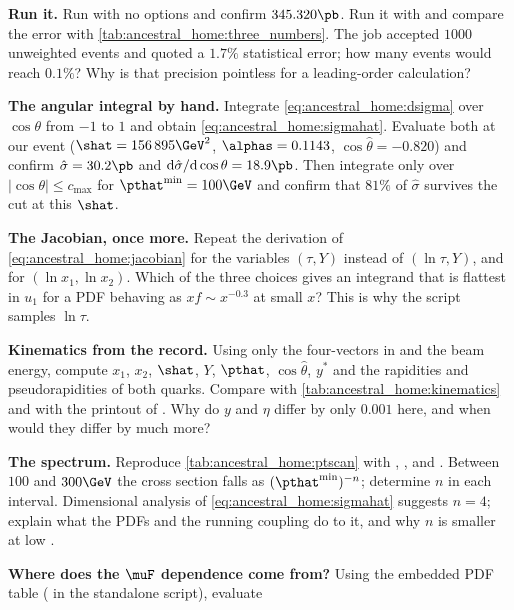 \begin{exercises}
\item \textbf{Run it.} Run  with no
  options and confirm $345.320\pb$. Run it with  and
  compare the error with \cref{tab:ancestral_home:three_numbers}. The
  \CMSSW job accepted $1000$ unweighted events and quoted a $1.7\%$
  statistical error; how many events would reach $0.1\%$? Why is that
  precision pointless for a leading-order calculation?
\item \textbf{The angular integral by hand.} Integrate
  \cref{eq:ancestral_home:dsigma} over $\cos\theta$ from $-1$ to $1$ and
  obtain \cref{eq:ancestral_home:sigmahat}. Evaluate both at our event
  ($\shat=156\,895\GeV^2$, $\alphas=0.1143$, $\cos\hat\theta=-0.820$) and
  confirm $\hat\sigma=30.2\pb$ and
  $\mathrm{d}\hat\sigma/\mathrm{d}\cos\theta=18.9\pb$. Then integrate only
  over $|\cos\theta|\le c_{\max}$ for $\pthat^{\min}=100\GeV$ and confirm
  that $81\%$ of $\hat\sigma$ survives the cut at this $\shat$.
\item \textbf{The Jacobian, once more.} Repeat the derivation of
  \cref{eq:ancestral_home:jacobian} for the variables $(\tau,Y)$ instead of
  $(\ln\tau,Y)$, and for $(\ln x_1,\ln x_2)$. Which of the three choices
  gives an integrand that is flattest in $u_1$ for a PDF behaving as
  $xf\sim x^{-0.3}$ at small $x$? This is why the script samples $\ln\tau$.
\item \textbf{Kinematics from the record.} Using only the four-vectors in
   and the beam energy, compute $x_1$, $x_2$, $\shat$, $Y$,
  $\pthat$, $\cos\hat\theta$, $y^{*}$ and the rapidities and pseudorapidities
  of both quarks. Compare with \cref{tab:ancestral_home:kinematics} and with
  the printout of . Why do $y$ and $\eta$ differ by
  only $0.001$ here, and when would they differ by much more?
\item \textbf{The \pt spectrum.} Reproduce \cref{tab:ancestral_home:ptscan}
  with , ,  and . Between
  $100$ and $300\GeV$ the cross section falls as $(\pthat^{\min})^{-n}$;
  determine $n$ in each interval. Dimensional analysis of
  \cref{eq:ancestral_home:sigmahat} suggests $n=4$; explain what the PDFs
  and the running coupling do to it, and why $n$ is smaller at low \pt.
\item \textbf{Where does the $\muF$ dependence come from?} Using the
  embedded PDF table ( in the standalone script), evaluate

\end{exercises}

